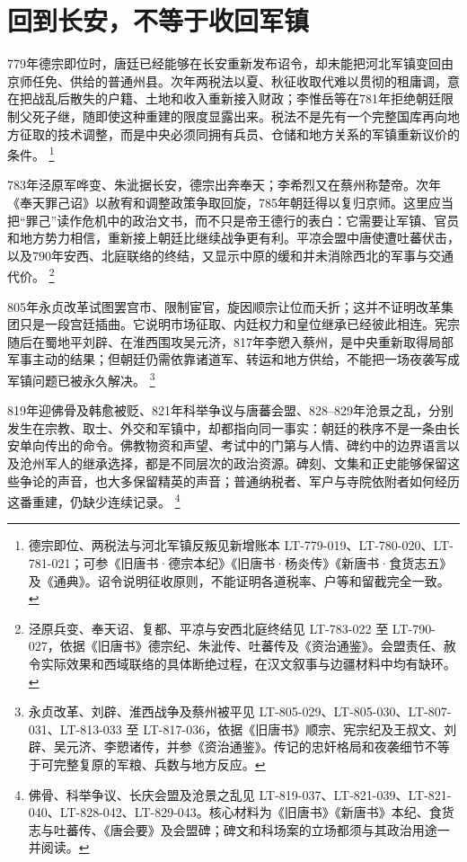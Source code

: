 \section{回到长安，不等于收回军镇}
\label{sec:middle-tang-reconstruction}

779年德宗即位时，唐廷已经能够在长安重新发布诏令，却未能把河北军镇变回由京师任免、供给的普通州县。次年两税法以夏、秋征收取代难以贯彻的租庸调，意在把战乱后散失的户籍、土地和收入重新接入财政；李惟岳等在781年拒绝朝廷限制父死子继，随即使这种重建的限度显露出来。税法不是先有一个完整国库再向地方征取的技术调整，而是中央必须同拥有兵员、仓储和地方关系的军镇重新议价的条件。%
\footnote{德宗即位、两税法与河北军镇反叛见新增账本 LT-779-019、LT-780-020、LT-781-021；可参《旧唐书·德宗本纪》《旧唐书·杨炎传》《新唐书·食货志五》及《通典》。诏令说明征收原则，不能证明各道税率、户等和留截完全一致。}

783年泾原军哗变、朱泚据长安，德宗出奔奉天；李希烈又在蔡州称楚帝。次年《奉天罪己诏》以赦宥和调整政策争取回旋，785年朝廷得以复归京师。这里应当把“罪己”读作危机中的政治文书，而不只是帝王德行的表白：它需要让军镇、官员和地方势力相信，重新接上朝廷比继续战争更有利。平凉会盟中唐使遭吐蕃伏击，以及790年安西、北庭联络的终结，又显示中原的缓和并未消除西北的军事与交通代价。%
\footnote{泾原兵变、奉天诏、复都、平凉与安西北庭终结见 LT-783-022 至 LT-790-027，依据《旧唐书》德宗纪、朱泚传、吐蕃传及《资治通鉴》。会盟责任、赦令实际效果和西域联络的具体断绝过程，在汉文叙事与边疆材料中均有缺环。}

805年永贞改革试图罢宫市、限制宦官，旋因顺宗让位而夭折；这并不证明改革集团只是一段宫廷插曲。它说明市场征取、内廷权力和皇位继承已经彼此相连。宪宗随后在蜀地平刘辟、在淮西围攻吴元济，817年李愬入蔡州，是中央重新取得局部军事主动的结果；但朝廷仍需依靠诸道军、转运和地方供给，不能把一场夜袭写成军镇问题已被永久解决。%
\footnote{永贞改革、刘辟、淮西战争及蔡州被平见 LT-805-029、LT-805-030、LT-807-031、LT-813-033 至 LT-817-036，依据《旧唐书》顺宗、宪宗纪及王叔文、刘辟、吴元济、李愬诸传，并参《资治通鉴》。传记的忠奸格局和夜袭细节不等于可完整复原的军粮、兵数与地方反应。}

819年迎佛骨及韩愈被贬、821年科举争议与唐蕃会盟、828--829年沧景之乱，分别发生在宗教、取士、外交和军镇中，却都指向同一事实：朝廷的秩序不是一条由长安单向传出的命令。佛教物资和声望、考试中的门第与人情、碑约中的边界语言以及沧州军人的继承选择，都是不同层次的政治资源。碑刻、文集和正史能够保留这些争论的声音，也大多保留精英的声音；普通纳税者、军户与寺院依附者如何经历这番重建，仍缺少连续记录。%
\footnote{佛骨、科举争议、长庆会盟及沧景之乱见 LT-819-037、LT-821-039、LT-821-040、LT-828-042、LT-829-043。核心材料为《旧唐书》《新唐书》本纪、食货志与吐蕃传、《唐会要》及会盟碑；碑文和科场案的立场都须与其政治用途一并阅读。}

